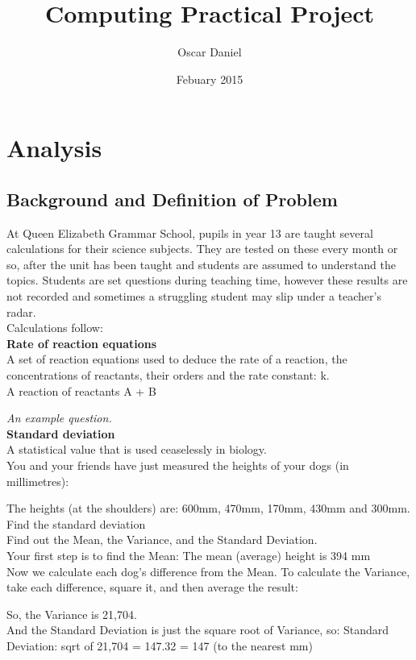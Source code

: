 \documentclass[a4paper,12pt]{book}
\title{Computing Practical Project}
\author{Oscar Daniel}
\date{Febuary 2015 }
\begin{document}
\maketitle
\tableofcontents

\chapter{Analysis}

\section{Background and Definition of Problem}
\begin{flushleft}
At Queen Elizabeth Grammar School, pupils in year 13 are taught several calculations for their science subjects. They are tested on these every month or so, after the unit has been taught and students are assumed to understand the topics. Students are set questions during teaching time, however these results are not recorded and sometimes a struggling student may slip under a teacher’s radar.
\\Calculations follow:\\
\textbf{Rate of reaction equations}\\
A set of reaction equations used to deduce the rate of a reaction, the concentrations of reactants, their orders and the rate constant: k. \\
A reaction of reactants A + B 

\emph{An example question.}	\\
\textbf{Standard deviation}\\
 A statistical value that is used ceaselessly in biology.\\
         You and your friends have just measured the heights of your dogs (in millimetres):

         The heights (at the shoulders) are: 600mm, 470mm, 170mm, 430mm and 300mm.
	Find the standard deviation\\
Find out the Mean, the Variance, and the Standard Deviation.\\
Your first step is to find the Mean:
The mean (average) height is 394 mm\\
Now we calculate each dog's difference from the Mean. To calculate the Variance, take each difference, square it, and then average the result:

So, the Variance is 21,704.\\
And the Standard Deviation is just the square root of Variance, so:
Standard Deviation: sqrt of  21,704 = 147.32  = 147 (to the nearest mm)\\



\end{flushleft}
\end{document}
